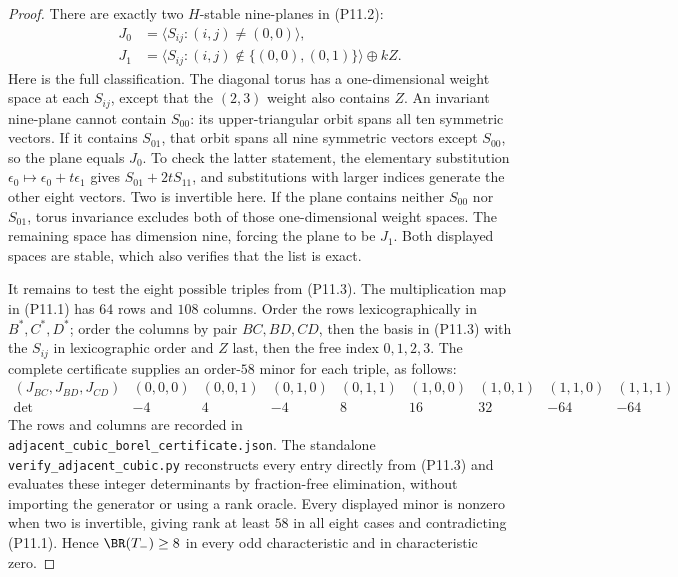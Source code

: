 \begin{proof}
There are exactly two $H$-stable nine-planes in (P11.2):
\[
 \begin{split}
 J_0&=\langle S_{ij}:(i,j)\ne(0,0)\rangle,\\
 J_1&=\langle S_{ij}:(i,j)\notin\{(0,0),(0,1)\}\rangle
          \oplus kZ.
 \end{split}
 \tag{P11.3}
\]
Here is the full classification. The diagonal torus
has a one-dimensional weight space at each $S_{ij}$,
except that the $(2,3)$ weight also contains $Z$.
An invariant nine-plane cannot contain $S_{00}$:
its upper-triangular orbit spans all ten symmetric
vectors. If it contains $S_{01}$, that orbit spans
all nine symmetric vectors except $S_{00}$, so the
plane equals $J_0$. To check the latter statement,
the elementary substitution
$\epsilon_0\mapsto\epsilon_0+t\epsilon_1$ gives
$S_{01}+2tS_{11}$, and substitutions with larger
indices generate the other eight vectors. Two is
invertible here. If the plane contains neither
$S_{00}$ nor $S_{01}$, torus invariance excludes both
of those one-dimensional weight spaces. The remaining
space has dimension nine, forcing the plane to be
$J_1$. Both displayed spaces are stable, which also
verifies that the list is exact.

It remains to test the eight possible triples from
(P11.3). The multiplication map in (P11.1) has $64$
rows and $108$ columns. Order the rows lexicographically
in $B^*,C^*,D^*$; order the columns by pair $BC,BD,CD$,
then the basis in (P11.3) with the $S_{ij}$ in
lexicographic order and $Z$ last, then the free index
$0,1,2,3$. The complete certificate supplies an
order-$58$ minor for each triple, as follows:
\[
\begin{array}{c|rrrrrrrr}
 (J_{BC},J_{BD},J_{CD})
 &(0,0,0)&(0,0,1)&(0,1,0)&(0,1,1)
 &(1,0,0)&(1,0,1)&(1,1,0)&(1,1,1)\\ \hline
 \det&-4&4&-4&8&16&32&-64&-64
\end{array}
\]
The rows and columns are recorded in
\texttt{adjacent\_cubic\_borel\_certificate.json}.
The standalone \texttt{verify\_adjacent\_cubic.py}
reconstructs every entry directly from (P11.3) and
evaluates these integer determinants by fraction-free
elimination, without importing the generator or using
a rank oracle. Every displayed minor is nonzero when
two is invertible, giving rank at least $58$ in all
eight cases and contradicting (P11.1). Hence
$\BR(T_-)\geq8$ in every odd characteristic and in
characteristic zero.


\end{proof}
